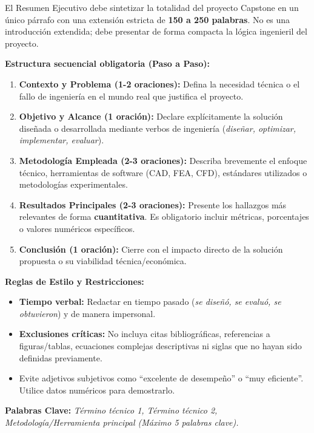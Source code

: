 \documentclass[12pt,letterpaper]{report}
\begin{document}
\endgroup

\tablaDeContenido
\listaDeIlustraciones
\listaDeTablas

\begin{resumen}
\begin{instruccionesresumen}
El Resumen Ejecutivo debe sintetizar la totalidad del proyecto Capstone en un único párrafo con una extensión estricta de \textbf{150 a 250 palabras}. No es una introducción extendida; debe presentar de forma compacta la lógica ingenieril del proyecto.

\vspace{2mm}
\noindent \textbf{Estructura secuencial obligatoria (Paso a Paso):}
\begin{enumerate}
  \item \textbf{Contexto y Problema (1-2 oraciones):} Defina la necesidad técnica o el fallo de ingeniería en el mundo real que justifica el proyecto.
  \item \textbf{Objetivo y Alcance (1 oración):} Declare explícitamente la solución diseñada o desarrollada mediante verbos de ingeniería (\textsl{diseñar, optimizar, implementar, evaluar}).
  \item \textbf{Metodología Empleada (2-3 oraciones):} Describa brevemente el enfoque técnico, herramientas de software (CAD, FEA, CFD), estándares utilizados o metodologías experimentales.
  \item \textbf{Resultados Principales (2-3 oraciones):} Presente los hallazgos más relevantes de forma \textbf{cuantitativa}. Es obligatorio incluir métricas, porcentajes o valores numéricos específicos.
  \item \textbf{Conclusión (1 oración):} Cierre con el impacto directo de la solución propuesta o su viabilidad técnica/económica.
\end{enumerate}

\vspace{2mm}
\noindent \textbf{Reglas de Estilo y Restricciones:}
\begin{itemize}
  \item \textbf{Tiempo verbal:} Redactar en tiempo pasado (\textsl{se diseñó, se evaluó, se obtuvieron}) y de manera impersonal.
  \item \textbf{Exclusiones críticas:} No incluya citas bibliográficas, referencias a figuras/tablas, ecuaciones complejas descriptivas ni siglas que no hayan sido definidas previamente.
  \item Evite adjetivos subjetivos como ``excelente de desempeño'' o ``muy eficiente''. Utilice datos numéricos para demostrarlo.
\end{itemize}

\vspace{3mm}
\noindent \textbf{Palabras Clave:} \textsl{Término técnico 1, Término técnico 2, Metodología/Herramienta principal (Máximo 5 palabras clave).}
\end{instruccionesresumen}
\end{resumen}
\end{document}
